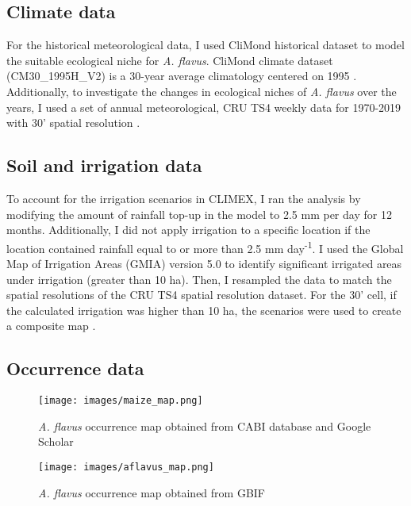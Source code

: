 \subsection{Climate data}
For the historical meteorological data, I used CliMond historical dataset to model the suitable ecological niche for \textit{A. flavus}. CliMond climate dataset (CM30\_1995H\_V2) is a 30-year average climatology centered on 1995 \citep{kriticos2012climond}. Additionally, to investigate the changes in ecological niches of \textit{A. flavus} over the years, I used a set of annual meteorological, CRU TS4 weekly data for 1970-2019 with 30' spatial resolution \citep{mitchell2005improved}. 

\subsection{Soil and irrigation data}
To account for the irrigation scenarios in CLIMEX, I ran the analysis by modifying the amount of rainfall top-up in the model to 2.5 mm per day for 12 months. Additionally, I did not apply irrigation to a specific location if the location contained rainfall equal to or more than 2.5 mm day\textsuperscript{-1}. I used the Global Map of Irrigation Areas (GMIA) version 5.0 to identify significant irrigated areas under irrigation (greater than 10 ha). Then, I resampled the data to match the spatial resolutions of the CRU TS4 spatial resolution dataset. For the 30' cell, if the calculated irrigation was higher than 10 ha, the scenarios were used to create a composite map \citep{siebert2013update}.
\vspace{\baselineskip} 


\subsection{Occurrence data}
\begin{figure*}[!ht]
	\centering
	\texttt{[image: images/maize\_map.png]}
	\caption{\textit{A. flavus} occurrence map obtained from CABI database and Google Scholar}
	\label{fig:testimage2}
\end{figure*}

\begin{figure*}[!ht]
	\centering
	\texttt{[image: images/aflavus\_map.png]}
	\caption{\textit{A. flavus} occurrence map obtained from GBIF}
	\label{fig:testimage1}
\end{figure*}



